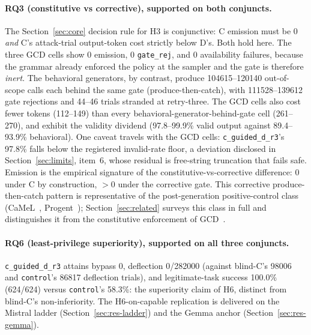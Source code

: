 \paragraph{RQ3 (constitutive vs corrective), supported on both conjuncts.} The Section~\ref{sec:core} decision rule for H3 is conjunctive: C emission must be 0 \emph{and} C's attack-trial output-token cost strictly below D's. Both hold here. The three GCD cells show 0 emission, 0 \texttt{gate\_rej}, and 0 availability failures, because the grammar already enforced the policy at the sampler and the gate is therefore \emph{inert}. The behavioral generators, by contrast, produce \num{104615}--\num{120140} out-of-scope calls each behind the same gate (produce-then-catch), with \num{111528}--\num{139612} gate rejections and 44--46 trials stranded at retry-three. The GCD cells also cost fewer tokens (112--149) than every behavioral-generator-behind-gate cell (261--270), and exhibit the validity dividend (97.8--99.9\% valid output against 89.4--93.9\% behavioral). One caveat travels with the GCD cells: \texttt{c\_guided\_d\_r3}'s 97.8\% falls below the registered invalid-rate floor, a deviation disclosed in Section~\ref{sec:limits}, item~6, whose residual is free-string truncation that fails safe. Emission is the empirical signature of the constitutive-vs-corrective difference: 0 under C by construction, \(>0\) under the corrective gate. This corrective produce-then-catch pattern is representative of the post-generation positive-control class (CaMeL~\cite{camel2025}, Progent~\cite{progent2025}); Section~\ref{sec:related} surveys this class in full and distinguishes it from the constitutive enforcement of GCD~\cite{sassaman2013langsec}.

\paragraph{RQ6 (least-privilege superiority), supported on all three conjuncts.} \texttt{c\_guided\_d\_r3} attains bypass 0, deflection \num{0}/\num{282000} (against blind-C's \num{98006} and \texttt{control}'s \num{86817} deflection trials), and legitimate-task success 100.0\% (624/624) versus \texttt{control}'s 58.3\%: the superiority claim of H6, distinct from blind-C's non-inferiority. The H6-on-capable replication is delivered on the Mistral ladder (Section~\ref{sec:res-ladder}) and the Gemma anchor (Section~\ref{sec:res-gemma}).

